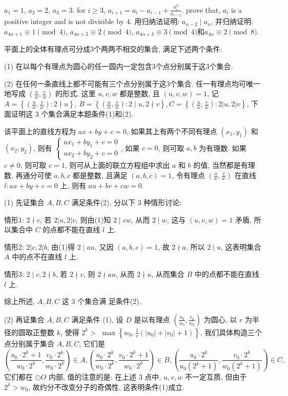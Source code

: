 \bq{}{}
$a_1=1$, $a_2=2$, $a_3=3$. for $i\ge 3$, $a_{i+1}=a_i-a_{i-1}+\frac{a_i^2}{a_{i-2}}$.
prove that, $a_i$ is a positive integer and is not divisible by $4$.
\eq
\ba
用归纳法证明: $a_{n-2}\mid a_n$, 并归纳证明: $a_{4n+1}\equiv 1\pmod{4}$, $a_{4n+2}\equiv 2\pmod{4}$, $a_{4n+3}\equiv 3\pmod{4}$和$a_{4n}\equiv 2\pmod{8}$.
\ea

平面上的全体有理点可分成$3$个两两不相交的集合, 满足下述两个条件:

(1) 在以每个有理点为圆心的任一圆内一定包含$3$个点分别属于这$3$个集合.

(2) 在任何一条直线上都不可能有三个点分别属于这$3$个集合.
\eq
\ba
任一有理点均可唯一地写成 $\left(\frac{u}{w}, \frac{v}{w}\right)$ 的形式, 这里 $u, v, w$ 都是整数, 且 $(u, v, w)=1$, 记 $A=\left\{\left(\frac{u}{w}, \frac{v}{w}\right): 2 \nmid u\right\}$, $B=\left\{\left(\frac{u}{w}, \frac{v}{w}\right): 2 \mid u, 2 \nmid v\right\}, C=\left\{\left(\frac{u}{w}, \frac{v}{w}\right): 2|u, 2| v\right\}$, 下面证明这 3 个集合满足本题条件(1)和(2).

该平面上的直线方程为 $a x+b y+c=0$, 如果其上有两个不同有理点 $\left(x_1, y_1\right)$ 和 $\left(x_2, y_2\right)$, 则有 $\left\{\begin{array}{l}a x_1+b y_1+c=0 \\ a x_2+b y_2+c=0\end{array}\right.$, 如果 $c=0$, 则可取 $a, b$ 为有理数. 如果 $c \neq 0$, 则可取 $c=1$, 则可从上面的联立方程组中求出 $a$ 和 $b$ 的值, 当然都是有理数, 再通分可使 $a, b, c$ 都是整数, 且满足 $(a, b, c)=1$, 令有理点 $\left(\frac{u}{w}, \frac{v}{w}\right)$ 在直线 $l: a x+b y+c=0$ 上, 则有 $a u+b v+c w=0$.

(1) 先证集合 $A, B, C$ 满足条件(2), 分以下 3 种情形讨论:

情形1: $2 \nmid c$, 若 $2|u, 2| v$, 则由(1)知 $2 \mid c w$, 从而 $2 \mid w$, 这与 $(u, v, w)=1$ 矛盾, 所以集合中 $C$ 的点都不能在直线 $l$ 上. 

情形2: $2|c, 2| b$, 由(1)得 $2 \mid a u$, 又因 $(a, b, c)=1$, 故 $2 \nmid a$, 所以 $2 \mid u$, 这表明集合 $A$ 中的点不在直线 $l$ 上.

情形3: $2 \mid c, 2 \nmid b$, 若 $2 \nmid v$, 则 $2 \nmid a u$, 从而 $2 \nmid u$, 从而集合 $B$ 中的点都不能在直线 $l$ 上. 

综上所述, $A, B, C$ 这 3 个集合满 足条件(2).

(2) 再证集合 $A, B, C$ 满足条件 (1), 设 $D$ 是以有理点 $\left(\frac{u_0}{w_0}, \frac{v_0}{w_0}\right)$ 为圆心, 以 $r$ 为半径的圆取正整数 $k$, 使得 $2^k>$ $\max \left\{w_0, \frac{1}{r}\left(\left|u_0\right|+\left|v_0\right|+1\right)\right\}$, 我们具体构造三个点分别属于集合 $A, B, C$, 它们是
$$
\left(\frac{u_0 \cdot 2^k+1}{w_0 \cdot 2^k}, \frac{v_0 \cdot 2^k}{w_0 \cdot 2^k}\right) \in A,\left(\frac{u_0 \cdot 2^k}{w_0 \cdot 2^k}, \frac{v_0 \cdot 2^k+1}{w_0 \cdot 2^k}\right) \in B,\left(\frac{u_0 \cdot 2^k}{u_0\left(2^k+1\right)}, \frac{v_0 \cdot 2^k}{w_0\left(2^k+1\right)}\right) \in C,
$$
它们都在 $\odot O$ 内部, 值的注意的是: 在上述 3 点中, $u, v, w$ 不一定互质, 但由于 $2^k>w_0$, 故约分不改变分子的奇偶性, 这表明条件(1)成立.
\ea
\newpage